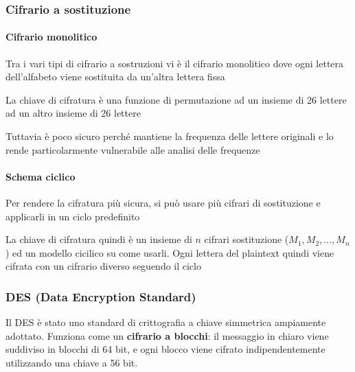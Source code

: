 \subsubsection{Cifrario a sostituzione}


\paragraph{Cifrario monolitico}
Tra i vari tipi di cifrario a sostruzioni vi è il cifrario monolitico dove ogni lettera dell'alfabeto viene sostituita da un'altra lettera fissa


La chiave di cifratura è una funzione di permutazione ad un insieme di 26 lettere ad un altro insieme di 26 lettere

Tuttavia è poco sicuro perché mantiene la frequenza delle lettere originali e lo rende particolarmente vulnerabile alle analisi delle frequenze

\paragraph{Schema ciclico} Per rendere la cifratura più sicura, si può usare più cifrari di sostituzione e applicarli in un ciclo predefinito

La chiave di cifratura quindi è un insieme di $n$ cifrari sostituzione ($M_1,M_2,\dots,M_n$) ed un modello cicilico su come usarli. Ogni lettera del plaintext quindi viene cifrata con un cifrario diverso seguendo il ciclo 

\subsubsection{DES (Data Encryption Standard)}
Il DES è stato uno standard di crittografia a chiave simmetrica ampiamente adottato. Funziona come un \textbf{cifrario a blocchi}: il messaggio in chiaro viene suddiviso in blocchi di 64 bit, e ogni blocco viene cifrato indipendentemente utilizzando una chiave a 56 bit.

